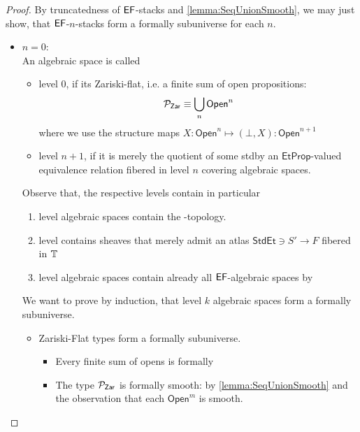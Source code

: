 \begin{proof}
	By truncatedness of $\mathsf{EF}$-stacks and \ref{lemma:SeqUnionSmooth}, we may just show, that $\mathsf{EF}$-$n$-stacks form a formally \etale subuniverse for each $n$. 
	\begin{itemize}
		\item $n=0$: \\ 
		
		An algebraic space is called 
		\begin{itemize}
			\item level 0, if its Zariski-flat, i.e. a finite sum of open propositions: \[
			\cP_{\Zar} \equiv \bigcup_n \mathsf{Open}^n %
			\]
			where we use the structure maps $X : \mathsf{Open}^n \mapsto (\bot , X) : \mathsf{Open}^{n+1}$
			\item level $n+1$, if it is merely the quotient of some std\etale by an $\mathsf{EtProp}$-valued equivalence relation fibered in level $n$ covering algebraic spaces.
		\end{itemize}
		Observe that, the respective levels contain in particular
		\begin{enumerate}
			\item level algebraic spaces contain the \etale-topology.
			\item level contains sheaves that merely admit an atlas $\mathsf{StdEt} \ni S' \to F$ fibered in $\mathbb{T}$ \\
			\item level algebraic spaces contain already all $\mathsf{EF}$-algebraic spaces by \todocite
		\end{enumerate}
		We want to prove by induction, that level $k$ algebraic spaces form a formally \etale subuniverse.
		\begin{itemize}
			\item  Zariski-Flat types form a formally \etale subuniverse. 
			\begin{itemize}
				\item Every finite sum of opens is formally \etale
				\item The type $\mathcal{P}_{\mathsf{Zar}}$ is formally smooth: by \ref{lemma:SeqUnionSmooth} and the observation that each $\mathsf{Open}^m$ is smooth.
			\end{itemize}

\end{itemize}
\end{itemize}
\end{proof}
